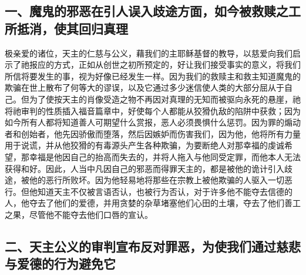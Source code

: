 
\subsection{一、魔鬼的邪恶在引人误入歧途方面，如今被救赎之工所抵消，使其回归真理}

极亲爱的诸位，天主的仁慈与公义，藉我们的主耶稣基督的教导，以慈爱向我们启示了祂报应的方式，正如从创世之初所预定的，好让我们接受事实的意义，将我们所信将要发生的事，视为好像已经发生一样。因为我们的救赎主和救主知道魔鬼的欺骗在世上散布了何等大的谬误，以及它通过多少迷信使人类的大部分屈从于自己。但为了使按天主的肖像受造之物不再因对真理的无知而被驱向永死的悬崖，祂将祂审判的性质插入福音篇章中，好使每个人都能从狡猾仇敌的陷阱中获救；因为如今所有人都将知道善人可期望什么赏报，恶人必须畏惧什么惩罚。因为罪的煽动者和创始者，他先因骄傲而堕落，然后因嫉妒而伤害我们，因为他，他将所有力量用于说谎，并从他狡猾的有毒源头产生各种欺骗，为要断绝人对那幸福的虔诚希望，那幸福是他因自己的抬高而失去的，并将人拖入与他同受定罪，而他本人无法获得和好。因此，人当中凡因自己的邪恶而得罪天主的，都是被他的诡计引入歧途，被他的恶行所败坏。因为他轻易地将那些在宗教上被他欺骗的人驱入一切恶行。但他知道天主不仅被言语否认，也被行为否认，对于许多他不能夺去信德的人，他夺去了他们的爱德，并用贪婪的杂草堵塞他们心田的土壤，夺去了他们善工之果，尽管他不能夺去他们口唇的宣认。\par


\subsection{二、天主公义的审判宣布反对罪恶，为使我们通过慈悲与爱德的行为避免它}

